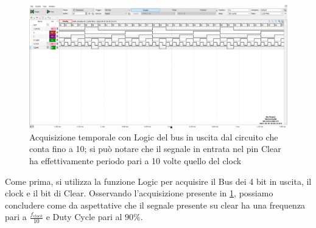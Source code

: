 \documentclass[10pt, a4paper, italian]{article}
\begin{document}
\begin{figure}[htbp]
\centering
	\includegraphics[width=\textwidth]{5.e}
	\caption{Acquisizione temporale con Logic del bus in uscita dal circuito che conta fino a 10; si può notare che il segnale in entrata nel pin Clear ha effettivamente periodo pari a 10 volte quello del clock \label{fig: Count_10th}}
\end{figure}
Come prima, si utilizza la funzione Logic per acquisire il Bus dei 4 bit in uscita, il clock e il bit di Clear.
Osservando l'acquisizione presente in \cref{fig: Count_10th}, possiamo concludere come da aspettative che il segnale presente su clear ha una frequenza pari a $\frac{f_{clock}}{10}$ e Duty Cycle pari al $90 \percent$.
\end{document}
